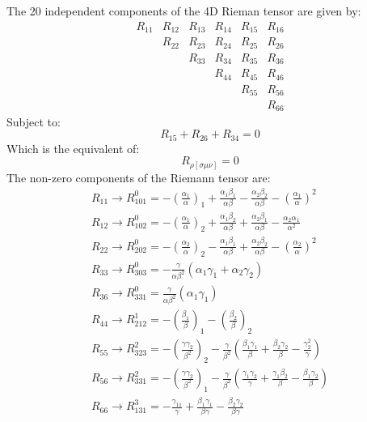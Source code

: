\documentclass{article}
\begin{document}
The 20 independent components of the 4D Rieman tensor are given by:
\begin{equation}
\begin{array}{cccccc}
R_{11} & R_{12} & R_{13} & R_{14} & R_{15} & R_{16} \\ & R_{22} & R_{23} & R_{24} & R_{25} & R_{26} \\ & & R_{33} & R_{34} & R_{35} & R_{36} \\ & & & R_{44} & R_{45} & R_{46} \\ & & & & R_{55} & R_{56} \\ & & & & & R_{66}
\end{array}
\end{equation}
Subject to:
\begin{equation}
R_{15} + R_{26} + R_{34} = 0
\end{equation}
Which is the equivalent of:
\begin{equation}
R_{\rho[\sigma\mu\nu]}=0
\end{equation}
The non-zero components of the Riemann tensor are:
\begin{equation}
\begin{array}{l}
R_{11}\rightarrow R_{101}^{0}=-\left(\frac{\alpha_{1}}{\alpha}\right)_{1}+\frac{\alpha_{1}\beta_{1}}{\alpha\beta}-\frac{\alpha_{2}\beta_{2}}{\alpha\beta}-\left(\frac{\alpha_{1}}{\alpha}\right)^{2}\\
R_{12}\rightarrow R_{102}^{0}=-\left(\frac{\alpha_{1}}{\alpha}\right)_{2}+\frac{\alpha_{1}\beta_{2}}{\alpha\beta}+\frac{\alpha_{2}\beta_{1}}{\alpha\beta}-\frac{\alpha_{2}\alpha_{1}}{\alpha^{2}}\\
R_{22}\rightarrow R_{202}^{0}=-\left(\frac{\alpha_{2}}{\alpha}\right)_{2}-\frac{\alpha_{1}\beta_{1}}{\alpha\beta}+\frac{\alpha_{2}\beta_{2}}{\alpha\beta}-\left(\frac{\alpha_{2}}{\alpha}\right)^{2}\\
R_{33}\rightarrow R_{303}^{0}=-\frac{\gamma}{\alpha\beta^{2}}\left(\alpha_{1}\gamma_{1}+\alpha_{2}\gamma_{2}\right)\\
R_{36}\rightarrow R_{331}^{0}=\frac{\gamma}{\alpha\beta^{2}}\left(\alpha_{1}\gamma_{1}\right)\\
R_{44}\rightarrow R_{212}^{1}=-\left(\frac{\beta_{1}}{\beta}\right)_{1}-\left(\frac{\beta_{2}}{\beta}\right)_{2}\\
R_{55}\rightarrow R_{323}^{2}=-\left(\frac{\gamma\gamma_{2}}{\beta^{2}}\right)_{2}-\frac{\gamma}{\beta^{2}}\left(\frac{\beta_{1}\gamma_{1}}{\beta}+\frac{\beta_{2}\gamma_{2}}{\beta}-\frac{\gamma_{2}^{2}}{\gamma}\right)\\
R_{56}\rightarrow R_{331}^{2}=-\left(\frac{\gamma\gamma_{2}}{\beta^{2}}\right)_{1}-\frac{\gamma}{\beta^{2}}\left(\frac{\gamma_{1}\gamma_{2}}{\gamma}+\frac{\gamma_{1}\beta_{2}}{\beta}-\frac{\beta_{1}\gamma_{2}}{\beta}\right)\\
R_{66}\rightarrow R_{131}^{3}=-\frac{\gamma_{11}}{\gamma}+\frac{\beta_{1}\gamma_{1}}{\beta\gamma}-\frac{\beta_{2}\gamma_{2}}{\beta\gamma}\\
\end{array}
\end{equation}
\end{document}
